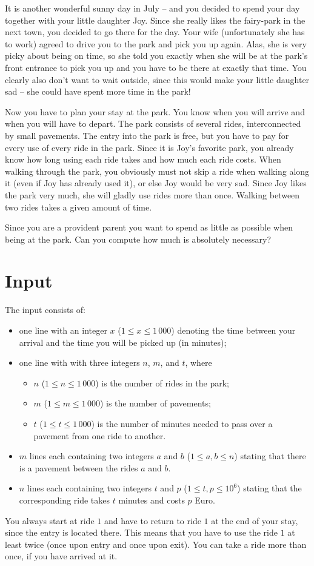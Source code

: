 It is another wonderful sunny day in July -- and you decided to spend your day together with your little daughter Joy.
Since she really likes the fairy-park in the next town, you decided to go there for the day.
Your wife (unfortunately she has to work) agreed to drive you to the park and pick you up again.
Alas, she is very picky about being on time, so she told you exactly when she will be at the park's front entrance to pick you up and you have to be there at exactly that time.
You clearly also don't want to wait outside, since this would make your little daughter sad -- she could have spent more time in the park!

Now you have to plan your stay at the park.
You know when you will arrive and when you will have to depart.
The park consists of several rides, interconnected by small pavements.
The entry into the park is free, but you have to pay for every use of every ride in the park.
Since it is Joy's favorite park, you already know how long using each ride takes and how much each ride costs.
When walking through the park, you obviously must not skip a ride when walking along it (even if Joy has already used it), or else Joy would be very sad.
Since Joy likes the park very much, she will gladly use rides more than once.
Walking between two rides takes a given amount of time.

Since you are a provident parent you want to spend as little as possible when being at the park.
Can you compute how much is absolutely necessary?

\section*{Input}
The input consists of:
\begin{itemize}
	\item one line with an integer $x$ ($1 \leq x \leq 1\,000$) denoting the time between your arrival and the time you will be picked up (in minutes);
	\item one line with with three integers $n$, $m$, and $t$, where
		\begin{itemize}
			\item $n$ ($1 \leq n \leq 1\,000$) is the number of rides in the park;
			\item $m$ ($1 \leq m \leq 1\,000$) is the number of pavements;
			\item $t$ ($1 \leq t \leq 1\,000$) is the number of minutes needed to pass over a pavement from one ride to another.
		\end{itemize}
	\item $m$ lines each containing two integers $a$ and $b$ ($1 \leq a,b \leq n$) stating that there is a pavement between the rides $a$ and $b$.
	\item $n$ lines each containing two integers $t$ and $p$ ($1 \leq t,p \leq 10^6$) stating that the corresponding ride takes $t$ minutes and costs $p$ Euro.
\end{itemize}
You always start at ride $1$ and have to return to ride $1$ at the end of your stay, since the entry is located there.
This means that you have to use the ride $1$ at least twice (once upon entry and once upon exit).
You can take a ride more than once, if you have arrived at it.

